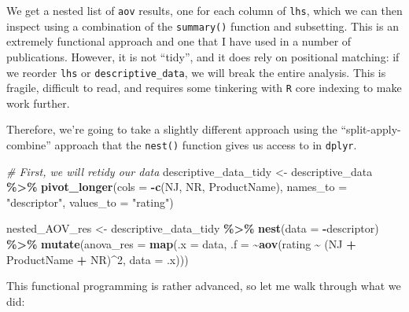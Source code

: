 \documentclass[
]{book}
\newenvironment{Shaded}{\begin{snugshade}}{\end{snugshade}}
\newcommand{\AttributeTok}[1]{\textcolor[rgb]{0.13,0.29,0.53}{#1}}
\newcommand{\CommentTok}[1]{\textcolor[rgb]{0.56,0.35,0.01}{\textit{#1}}}
\newcommand{\DecValTok}[1]{\textcolor[rgb]{0.00,0.00,0.81}{#1}}
\newcommand{\FunctionTok}[1]{\textcolor[rgb]{0.13,0.29,0.53}{\textbf{#1}}}
\newcommand{\NormalTok}[1]{#1}
\newcommand{\OtherTok}[1]{\textcolor[rgb]{0.56,0.35,0.01}{#1}}
\newcommand{\SpecialCharTok}[1]{\textcolor[rgb]{0.81,0.36,0.00}{\textbf{#1}}}
\newcommand{\StringTok}[1]{\textcolor[rgb]{0.31,0.60,0.02}{#1}}
\begin{document}
We get a nested list of \texttt{aov} results, one for each column of \texttt{lhs}, which we can then inspect using a combination of the \texttt{summary()} function and subsetting. This is an extremely functional approach and one that I have used in a number of publications. However, it is not ``tidy'', and it does rely on positional matching: if we reorder \texttt{lhs} or \texttt{descriptive\_data}, we will break the entire analysis. This is fragile, difficult to read, and requires some tinkering with \texttt{R} core indexing to make work further.

Therefore, we're going to take a slightly different approach using the ``split-apply-combine'' approach that the \texttt{nest()} function gives us access to in \texttt{dplyr}.

\begin{Shaded}
\begin{Highlighting}[]
\CommentTok{\# First, we will retidy our data}
\NormalTok{descriptive\_data\_tidy }\OtherTok{\textless{}{-}} 
\NormalTok{  descriptive\_data }\SpecialCharTok{\%\textgreater{}\%}
  \FunctionTok{pivot\_longer}\NormalTok{(}\AttributeTok{cols =} \SpecialCharTok{{-}}\FunctionTok{c}\NormalTok{(NJ, NR, ProductName),}
               \AttributeTok{names\_to =} \StringTok{"descriptor"}\NormalTok{,}
               \AttributeTok{values\_to =} \StringTok{"rating"}\NormalTok{)}

\NormalTok{nested\_AOV\_res }\OtherTok{\textless{}{-}} 
\NormalTok{  descriptive\_data\_tidy }\SpecialCharTok{\%\textgreater{}\%}
  \FunctionTok{nest}\NormalTok{(}\AttributeTok{data =} \SpecialCharTok{{-}}\NormalTok{descriptor) }\SpecialCharTok{\%\textgreater{}\%}
  \FunctionTok{mutate}\NormalTok{(}\AttributeTok{anova\_res =} \FunctionTok{map}\NormalTok{(}\AttributeTok{.x =}\NormalTok{ data,}
                         \AttributeTok{.f =} \SpecialCharTok{\textasciitilde{}}\FunctionTok{aov}\NormalTok{(rating }\SpecialCharTok{\textasciitilde{}}\NormalTok{ (NJ }\SpecialCharTok{+}\NormalTok{ ProductName }\SpecialCharTok{+}\NormalTok{ NR)}\SpecialCharTok{\^{}}\DecValTok{2}\NormalTok{, }\AttributeTok{data =}\NormalTok{ .x)))}
\end{Highlighting}
\end{Shaded}

This functional programming is rather advanced, so let me walk through what we did:
\end{document}
